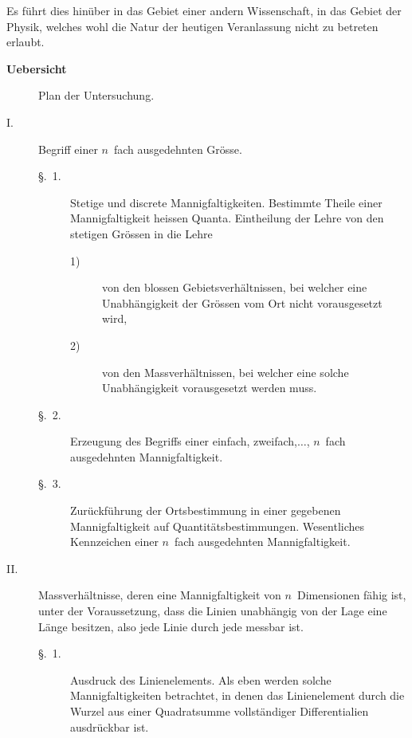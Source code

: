 \documentclass[a4paper,12pt]{article}
\begin{document}
Es f\"{u}hrt dies hin\"{u}ber in das Gebiet einer andern
Wissenschaft, in das Gebiet der Physik, welches wohl die Natur
der heutigen Veranlassung nicht zu betreten erlaubt.

\bigbreak

\begin{center}
\large\bfseries
Uebersicht
\end{center}

\begin{description}
\item[]
Plan der Untersuchung.

\item[\textmd{I.}]
Begriff einer $n$~fach ausgedehnten Gr\"{o}sse.

\begin{description}
\item[\textmd{\S.~1.}]
Stetige und discrete Mannigfaltigkeiten.  Bestimmte Theile einer
Mannigfaltigkeit heissen Quanta.  Eintheilung der Lehre von den
stetigen Gr\"{o}ssen in die Lehre
\begin{description}
\item[\textmd{1)}]
von den blossen Gebietsverh\"{a}ltnissen, bei welcher eine
Unabh\"{a}ngigkeit der Gr\"{o}ssen vom Ort nicht vorausgesetzt
wird,

\item[\textmd{2)}]
von den Massverh\"{a}ltnissen, bei welcher eine solche
Unabh\"{a}ngigkeit vorausgesetzt werden muss.
\end{description}

\item[\textmd{\S.~2.}]
Erzeugung des Begriffs einer einfach, zweifach,$\ldots$, $n$~fach
ausgedehnten Mannigfaltigkeit.

\item[\textmd{\S.~3.}]
Zur\"{u}ckf\"{u}hrung der Ortsbestimmung in einer gegebenen
Mannigfaltigkeit auf Quantit\"{a}tsbestimmungen.  Wesentliches
Kennzeichen einer $n$~fach ausgedehnten Mannigfaltigkeit.
\end{description}

\item[\textmd{II.}]
Massverh\"{a}ltnisse, deren eine Mannigfaltigkeit von
$n$~Dimensionen f\"{a}hig ist, unter der Voraussetzung, dass die
Linien unabh\"{a}ngig von der Lage eine L\"{a}nge besitzen, also
jede Linie durch jede messbar ist.

\begin{description}
\item[\textmd{\S.~1.}]
Ausdruck des Linienelements.  Als eben werden solche
Mannigfaltigkeiten betrachtet, in denen das Linienelement durch
die Wurzel aus einer Quadratsumme vollst\"{a}ndiger
Differentialien ausdr\"{u}ckbar ist.


\end{description}
\end{description}
\end{document}
